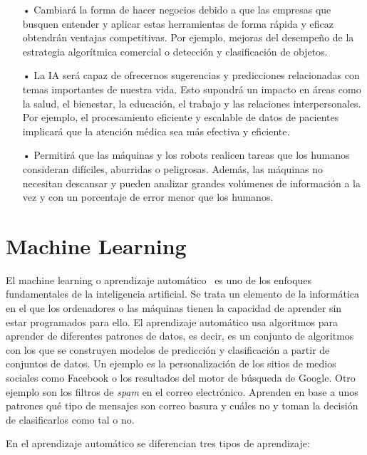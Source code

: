 \documentclass[a4paper, 12pt]{book}
\begin{document}
\begin{itemize}

    \item[•] Cambiará la forma de hacer negocios debido a que las empresas que busquen entender y aplicar estas herramientas de forma rápida y eficaz obtendrán ventajas competitivas. 
    Por ejemplo, mejoras del desempeño de la estrategia algorítmica comercial o detección y clasificación de objetos.
    
	\item[•] La IA será capaz de ofrecernos sugerencias y predicciones relacionadas con temas importantes de nuestra vida. Esto supondrá un impacto en áreas como la salud, el bienestar, la educación, el trabajo y las relaciones interpersonales. 
	Por ejemplo, el procesamiento eficiente y escalable de datos de pacientes implicará que la atención médica sea más efectiva y eficiente. 

	\item[•] Permitirá que las máquinas y los robots realicen tareas que los humanos consideran difíciles, aburridas o peligrosas. 
	Además, las máquinas no necesitan descansar y pueden analizar grandes volúmenes de información a la vez y con un porcentaje de error menor que los humanos.
	
\end{itemize}

\section{Machine Learning} 
\label{sec:MachineLearning}
El machine learning o aprendizaje automático~\cite{rouhiainen2018inteligencia}  es uno de los enfoques fundamentales de la inteligencia artificial. 
Se trata un elemento de la informática en el que los ordenadores o las máquinas tienen la capacidad de aprender sin estar programados para ello. 
El aprendizaje automático usa algoritmos para aprender de diferentes patrones de datos, es decir, es un conjunto de algoritmos con los que se construyen modelos de predicción y clasificación a partir de conjuntos de datos. 
Un ejemplo es la personalización de los sitios de medios sociales como Facebook o los resultados del motor de
búsqueda de Google. 
Otro ejemplo son  los filtros de \emph{spam} en el correo electrónico. 
Aprenden en base a unos patrones qué tipo de mensajes son correo basura y cuáles no y toman la decisión de clasificarlos como tal o no.

En el aprendizaje automático se diferencian tres tipos de aprendizaje:
\end{document}
